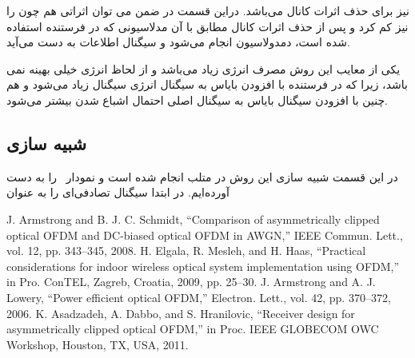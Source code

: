 \documentclass{article}
\begin{document}
 نیز برای حذف اثرات کانال می‌باشد. دراین قسمت در ضمن می توان اثراتی هم چون  را نیز کم کرد و پس از حذف اثرات کانال مطابق با آن مدلاسیونی که در فرستنده استفاده شده است، دمدولاسیون انجام می‌شود و سیگنال اطلاعات به دست می‌آید.  

یکی از معایب این روش مصرف انرژی زیاد می‌باشد و از لحاظ انرژی خیلی بهینه نمی باشد، زیرا که در فرستنده با افزودن بایاس به سیگنال انرژی سیگنال زیاد می‌شود و هم چنین با افزودن سیگنال بایاس به سیگنال اصلی احتمال اشباع شدن بیشتر می‌شود.


\subsection{شبیه سازی}
در این قسمت شبیه سازی این روش در متلب انجام شده است و نمودار \ را به دست آورده‌ایم. در ابتدا سیگنال تصادفی‌ای را به عنوان 

\clearpage
\setLTRbibitems
\begin{thebibliography}{9}
\resetlatinfont
{}
J. Armstrong and B. J. C. Schmidt, “Comparison of asymmetrically
clipped optical OFDM and DC-biased optical OFDM in AWGN,”
IEEE Commun. Lett., vol. 12, pp. 343–345, 2008.
H. Elgala, R. Mesleh, and H. Haas, “Practical considerations for indoor wireless optical system implementation using OFDM,” in Pro.
ConTEL, Zagreb, Croatia, 2009, pp. 25–30.
J. Armstrong and A. J. Lowery, “Power efficient optical OFDM,” Electron. Lett., vol. 42, pp. 370–372, 2006.
K. Asadzadeh, A. Dabbo, and S. Hranilovic, “Receiver design for
asymmetrically clipped optical OFDM,” in Proc. IEEE GLOBECOM
OWC Workshop, Houston, TX, USA, 2011.
\end{thebibliography}
\end{document}
